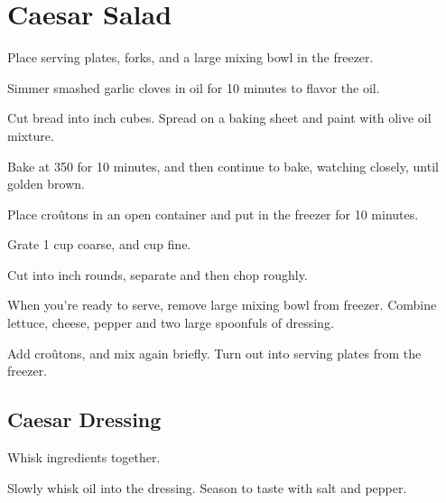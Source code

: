 \section{Caesar Salad}
\begin{recipe}


Place serving plates, forks, and a large mixing bowl in the freezer.


Simmer smashed garlic cloves in oil for 10 minutes to flavor the oil.

Cut bread into  inch cubes. Spread on a baking sheet and paint with olive oil mixture.

Bake at 350\degree{} for 10 minutes, and then continue to bake, watching closely, until golden brown.

Place croûtons in an open container and put in the freezer for 10 minutes.


Grate 1 cup coarse, and  cup fine.


Cut into  inch rounds, separate and then chop roughly.


When you're ready to serve, remove large mixing bowl from freezer. 
Combine lettuce, cheese, pepper and two large spoonfuls of dressing.

Add croûtons, and mix again briefly. Turn out into serving plates from the freezer.

\subsection{Caesar Dressing}


Whisk ingredients together.


Slowly whisk oil into the dressing. Season to taste with salt and pepper.

\end{recipe}
